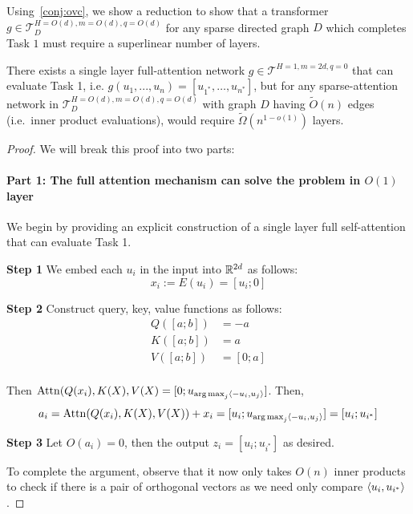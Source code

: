 Using~\cref{conj:ovc}, we show a reduction to show that a 
transformer $g \in \mathcal{T}_D^{H=O(d),m=O(d),q=O(d)}$ for any sparse directed graph $D$ 
which completes Task $1$  must require a superlinear number of layers. 

\begin{proposition}
    There exists a single layer full-attention network $g\in\mathcal{T}^{H=1,m=2d,q=0}$ that can 
    evaluate Task 1,  i.e. $g(u_1,...,u_n) = [u_{1^*},\dots, u_{n^*}]$, but for any sparse-attention network in $\mathcal{T}_D^{H=O(d),m=O(d),q=O(d)}$ with
    graph $D$ having $\tilde{O}(n)$ edges (i.e.~inner product evaluations), would require $\tilde{\Omega}(n^{1-o(1)})$ layers.
\end{proposition}
\begin{proof}
We will break this proof into two parts:
\paragraph{Part 1: The full attention mechanism can solve the problem in $O(1)$ layer}
We begin by providing an explicit construction of a single layer full self-attention that can evaluate Task 1.

\textbf{Step 1} 
We embed each $u_i$ in the input into $\mathbb{R}^{2d}$ as follows:
\begin{equation}
    x_i := E(u_i) = [u_i; 0]
\end{equation}

\textbf{Step 2}
Construct query, key, value functions as follows:
\begin{equation}
\begin{aligned}
    Q([a; b]) &= -a \\
    K([a; b]) &= a \\
    V([a; b]) &= [0; a] \\
\end{aligned}
\end{equation}

Then $\mathrm{Attn}(Q(x_i), K(X), V(X) = [0; u_{\operatorname*{arg\,max}_{j} \langle -u_i, u_j \rangle}] $. Then,
\begin{equation}
    a_i = \mathrm{Attn}(Q(x_i), K(X), V(X)) + x_i = [u_i; u_{\operatorname*{arg\,max}_{j} \langle -u_i, u_j \rangle}] = [u_i; u_{i^*}]
\end{equation}

\textbf{Step 3} 
Let $O(a_i) = 0$, then the output $z_i = [u_i; u_{i^*}]$ as desired.

To complete the argument, observe that it now only takes $O(n)$ inner products to check
if there is a pair of orthogonal vectors as we need only compare $\left \langle u_i, u_{i^*} \right \rangle$. 


\end{proof}
